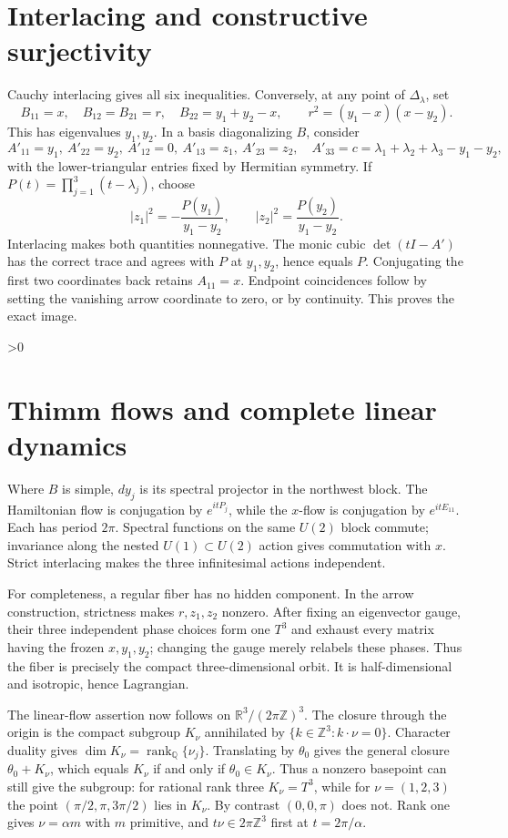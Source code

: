 \documentclass[10pt]{article}
\newcommand{\RR}{\mathbb R}
\newcommand{\ZZ}{\mathbb Z}
\begin{document}
\section{Interlacing and constructive surjectivity}
Cauchy interlacing gives all six inequalities.  Conversely, at any point of $\Delta_\lambda$, set
\[
 B_{11}=x,\quad B_{12}=B_{21}=r,\quad B_{22}=y_1+y_2-x,
 \qquad r^2=(y_1-x)(x-y_2).
\]
This has eigenvalues $y_1,y_2$.  In a basis diagonalizing $B$, consider
\[
 A'_{11}=y_1,\ A'_{22}=y_2,\ A'_{12}=0,\ A'_{13}=z_1,\ A'_{23}=z_2,
 \quad A'_{33}=c=\lambda_1+\lambda_2+\lambda_3-y_1-y_2,
\]
with the lower-triangular entries fixed by Hermitian symmetry.
If $P(t)=\prod_{j=1}^3(t-\lambda_j)$, choose
\[
 |z_1|^2=-\frac{P(y_1)}{y_1-y_2},\qquad
 |z_2|^2=\frac{P(y_2)}{y_1-y_2}.
\]
Interlacing makes both quantities nonnegative.  The monic cubic $\det(tI-A')$ has the correct trace and agrees with $P$ at $y_1,y_2$, hence equals $P$.  Conjugating the first two coordinates back retains $A_{11}=x$.  Endpoint coincidences follow by setting the vanishing arrow coordinate to zero, or by continuity.  This proves the exact image.

\ifnum\CRevisionRound>0
\section{Thimm flows and complete linear dynamics}
Where $B$ is simple, $dy_j$ is its spectral projector in the northwest block.  The Hamiltonian flow is conjugation by $e^{itP_j}$, while the $x$-flow is conjugation by $e^{itE_{11}}$.  Each has period $2\pi$.  Spectral functions on the same $U(2)$ block commute; invariance along the nested $U(1)\subset U(2)$ action gives commutation with $x$.  Strict interlacing makes the three infinitesimal actions independent.

For completeness, a regular fiber has no hidden component.  In the arrow construction, strictness makes $r,z_1,z_2$ nonzero.  After fixing an eigenvector gauge, their three independent phase choices form one $T^3$ and exhaust every matrix having the frozen $x,y_1,y_2$; changing the gauge merely relabels these phases.  Thus the fiber is precisely the compact three-dimensional orbit.  It is half-dimensional and isotropic, hence Lagrangian.

The linear-flow assertion now follows on $\RR^3/(2\pi\ZZ)^3$.  The closure through the origin is the compact subgroup $K_\nu$ annihilated by
\(
 \{k\in\ZZ^3:k\cdot\nu=0\}.
\)
Character duality gives $\dim K_\nu=\operatorname{rank}_{\mathbb Q}\{\nu_j\}$.  Translating by $\theta_0$ gives the general closure $\theta_0+K_\nu$, which equals $K_\nu$ if and only if $\theta_0\in K_\nu$.  Thus a nonzero basepoint can still give the subgroup: for rational rank three $K_\nu=T^3$, while for $\nu=(1,2,3)$ the point $(\pi/2,\pi,3\pi/2)$ lies in $K_\nu$.  By contrast $(0,0,\pi)$ does not.  Rank one gives $\nu=\alpha m$ with $m$ primitive, and $t\nu\in2\pi\ZZ^3$ first at $t=2\pi/\alpha$.
\end{document}
